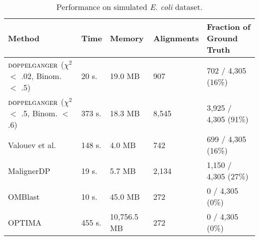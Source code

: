 \begin{table*}[htb]
  \small
  \centering
  \begin{tabular}{l|l|l|l|l}
	{\bf Method}	& {\bf Time}		& {\bf Memory} 	& {\bf Alignments } & {\bf Fraction of Ground Truth}\\
	\hline
	\hline
   	 $\mbox{\rm {\sc doppelganger}}$ ($\chi^2$  $<$ .02, Binom. $<$ .5)    	 	& 20 s.		& 19.0 MB & 907 & 702 / 4,305  (16\%)\\
   	 $\mbox{\rm {\sc doppelganger}}$ ($\chi^2$  $<$ .5, Binom. $<$ .6)    	 	& 373 s. 		& 18.3 MB & 8,545	& 3,925 / 4,305 (91\%) \\
	Valouev et al. 		& 148 s. 	& 4.0 MB		&  742 & 699 / 4,305 (16\%) \\
    MalignerDP          & 19 s.     & 5.7 MB        & 2,134 & 1,150 / 4,305 (27\%) \\
    OMBlast              & 10 s.     & 45.0 MB       & 272  & 0 / 4,305 (0\%) \\
    OPTIMA              & 455 s.     & 10,756.5 MB       & 272  & 0 / 4,305 (0\%) \\    
	\end{tabular}
      \caption{Performance on simulated {\it E. coli} dataset.}
 \label{tbl-ecoli}
\end{table*}






